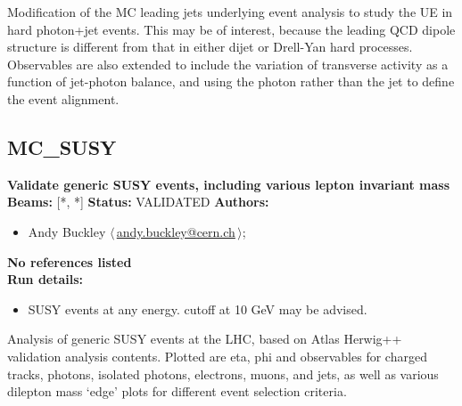 \noindent Modification of the MC leading jets underlying event analysis to study the UE in hard photon+jet events. This may be of interest, because the leading QCD dipole structure is different from that in either dijet or Drell-Yan hard processes. Observables are also extended to include the variation of transverse activity as a function of jet-photon balance, and using the photon rather than the jet to define the event alignment.

\clearpage


\clearpage

\subsection{MC\_SUSY}
\textbf{Validate generic SUSY events, including various lepton invariant mass}\newline
\textbf{Beams:} [*, *] \newline
\textbf{Status:} VALIDATED\newline
\textbf{Authors:}
\begin{itemize}
  \item Andy Buckley $\langle\,$\href{mailto:andy.buckley@cern.ch}{andy.buckley@cern.ch}$\,\rangle$;
\end{itemize}
\textbf{No references listed}\\ 
\textbf{Run details:}
\begin{itemize}

  \item SUSY events at any energy. \pT cutoff at 10 GeV may be advised.\end{itemize}

\noindent Analysis of generic SUSY events at the LHC, based on Atlas Herwig++ validation analysis contents. Plotted are eta, phi and \pT observables for charged tracks, photons, isolated photons, electrons, muons, and jets, as well as various dilepton mass `edge' plots for different event selection criteria.

\clearpage


\clearpage

